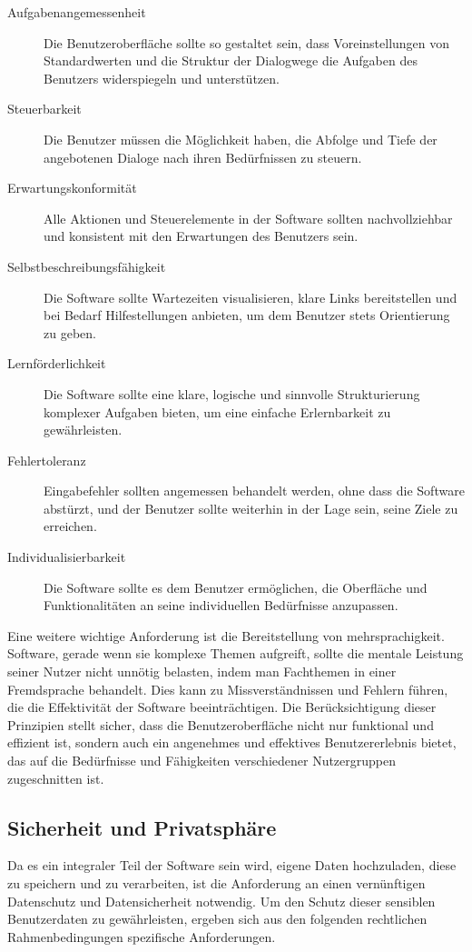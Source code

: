 \begin{description}
    \item[Aufgabenangemessenheit] Die Benutzeroberfläche sollte so gestaltet sein, dass Voreinstellungen von Standardwerten und die Struktur der Dialogwege die Aufgaben des Benutzers widerspiegeln und unterstützen.
    \item[Steuerbarkeit] Die Benutzer müssen die Möglichkeit haben, die Abfolge und Tiefe der angebotenen Dialoge nach ihren Bedürfnissen zu steuern.
    \item[Erwartungskonformität] Alle Aktionen und Steuerelemente in der Software sollten nachvollziehbar und konsistent mit den Erwartungen des Benutzers sein.
    \item[Selbstbeschreibungsfähigkeit] Die Software sollte Wartezeiten visualisieren, klare Links bereitstellen und bei Bedarf Hilfestellungen anbieten, um dem Benutzer stets Orientierung zu geben.
    \item[Lernförderlichkeit] Die Software sollte eine klare, logische und sinnvolle Strukturierung komplexer Aufgaben bieten, um eine einfache Erlernbarkeit zu gewährleisten.
    \item[Fehlertoleranz] Eingabefehler sollten angemessen behandelt werden, ohne dass die Software abstürzt, und der Benutzer sollte weiterhin in der Lage sein, seine Ziele zu erreichen.
    \item[Individualisierbarkeit] Die Software sollte es dem Benutzer ermöglichen, die Oberfläche und Funktionalitäten an seine individuellen Bedürfnisse anzupassen.
\end{description}

Eine weitere wichtige Anforderung ist die Bereitstellung von mehrsprachigkeit. Software, gerade wenn sie komplexe Themen aufgreift, sollte die mentale Leistung seiner Nutzer nicht unnötig belasten, indem man Fachthemen in einer Fremdsprache behandelt.
Dies kann zu Missverständnissen und Fehlern führen, die die Effektivität der Software beeinträchtigen. 
Die Berücksichtigung dieser Prinzipien stellt sicher, dass die Benutzeroberfläche nicht nur funktional und effizient ist, sondern auch ein angenehmes und effektives Benutzererlebnis bietet, 
das auf die Bedürfnisse und Fähigkeiten verschiedener Nutzergruppen zugeschnitten ist.




\subsection{Sicherheit und Privatsphäre}
Da es ein integraler Teil der Software sein wird, eigene Daten hochzuladen, diese zu speichern und zu verarbeiten, ist die Anforderung an einen vernünftigen Datenschutz und Datensicherheit notwendig. 
Um den Schutz dieser sensiblen Benutzerdaten zu gewährleisten, ergeben sich aus den folgenden rechtlichen Rahmenbedingungen spezifische Anforderungen.

